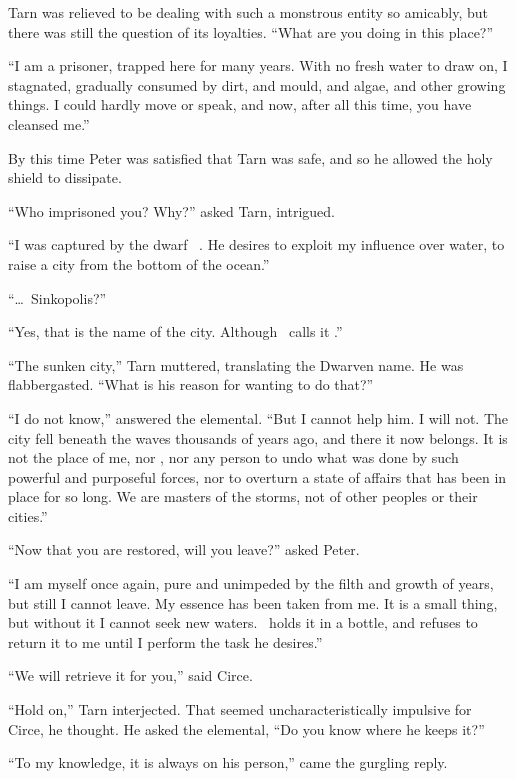 Tarn was relieved to be dealing with such a monstrous entity so amicably, but there was still the question of its loyalties. ``What are you doing in this place?''  

``I am a prisoner, trapped here for many years.  With no fresh water to draw on, I stagnated, gradually consumed by dirt, and mould, and algae, and other growing things.  I could hardly move or speak, and now, after all this time, you have cleansed me.''

By this time Peter was satisfied that Tarn was safe, and so he allowed the holy shield to dissipate.

``Who imprisoned you?  Why?''  asked Tarn, intrigued.

``I was captured by the dwarf \mothzam\ \driktur.  He desires to exploit my influence over water, to raise a city from the bottom of the ocean.''

``\ldots\ Sinkopolis?''

``Yes, that is the name of the city.  Although \mothzam\ calls it \valdunmir.''

``The sunken city,'' Tarn muttered, translating the Dwarven name.  He was flabbergasted. ``What is his reason for wanting to do that?''

``I do not know,'' answered the elemental.  ``But I cannot help him.  I will not.  The city fell beneath the waves thousands of years ago, and there it now belongs.  It is not the place of me, nor \mothzam, nor any person to undo what was done by such powerful and purposeful forces, nor to overturn a state of affairs that has been in place for so long.  We are masters of the storms, not of other peoples or their cities.''

``Now that you are restored, will you leave?'' asked Peter.

``I am myself once again, pure and unimpeded by the filth and growth of years, but still I cannot leave.  My essence has been taken from me.  It is a small thing, but without it I cannot seek new waters.  \mothzam\ holds it in a bottle, and refuses to return it to me until I perform the task he desires.''

``We will retrieve it for you,'' said Circe.

``Hold on,'' Tarn interjected.  That seemed uncharacteristically impulsive for Circe, he thought.  He asked the elemental, ``Do you know where he keeps it?''

``To my knowledge, it is always on his person,'' came the gurgling reply.

